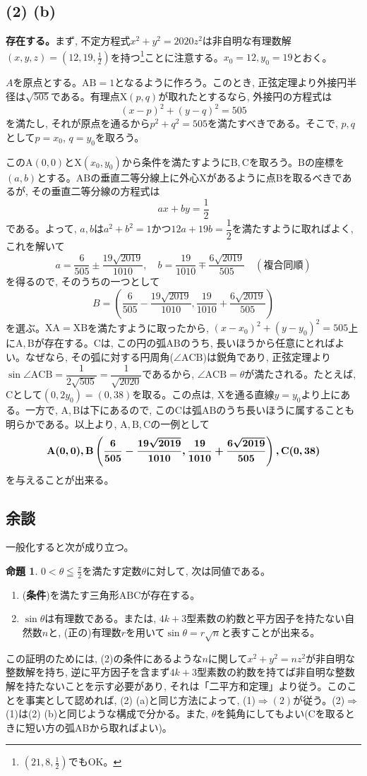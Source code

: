 \documentclass[twocolumn]{jbook}
\theoremstyle{definition}
\newtheorem{prop}[theo]{命題}
\newcommand{\bolm}[1]{{\mbox{\boldmath $#1$}}}
\newcommand{\tf}[1]{\textbf{#1}}
\newcommand{\ben}{\begin{enumerate}}
\newcommand{\een}{\end{enumerate}}
\newcommand{\nara}{\Rightarrow}
\newcommand{\mr}{\mathrm}
\renewcommand{\leq}{\leqq}
\newcommand{\parena}[1]{\left( #1\right)}
\begin{document}
\subsection*{(2) (b)} \tf{存在する。}まず, 不定方程式$x^2 + y^2 = 2020z^2$は非自明な有理数解$(x,y,z) = (12,19,\frac{1}{2})$を持つ\footnote{$(21,8,\frac{1}{2})$でもOK。}ことに注意する。$x_0=12, y_0=19$とおく。\par
$A$を原点とする。$\mr{AB} = 1$となるように作ろう。このとき, 正弦定理より外接円半径は$\sqrt{505}$である。有理点$\mr{X}(p,q)$が取れたとするなら, 外接円の方程式は
\[(x-p)^2 + (y-q)^2 = 505\]
を満たし, それが原点を通るから$p^2 + q^2 = 505$を満たすべきである。そこで, $p,q$として$p=x_0$, $q=y_0$を取ろう。\par
この$\mr{A}(0,0)$と$\mr{X}(x_0,y_0)$から条件を満たすように$\mr{B},\mr{C}$を取ろう。$\mr{B}$の座標を$(a,b)$とする。$\mr{AB}$の垂直二等分線上に外心$\mr{X}$があるように点$\mr{B}$を取るべきであるが, その垂直二等分線の方程式は
\[ax+by = \dfrac{1}{2}\]
である。よって, $a,b$は$a^2 + b^2 = 1$かつ$12a + 19b=\dfrac{1}{2}$を満たすように取ればよく, これを解いて
\[a= \dfrac{6}{505} \pm \dfrac{19\sqrt{2019}}{1010},\quad b=\dfrac{19}{1010}\mp \dfrac{6\sqrt{2019}}{505}\quad (複合同順)\]
を得るので, そのうちの一つとして
\[B = \parena{\dfrac{6}{505} - \dfrac{19\sqrt{2019}}{1010},\dfrac{19}{1010}+ \dfrac{6\sqrt{2019}}{505}}\]
を選ぶ。$\mr{XA} = \mr{XB}$を満たすように取ったから, $(x-x_0)^2 + (y-y_0)^2 = 505$上に$\mr{A},\mr{B}$が存在する。$\mr{C}$は, この円の弧$\mr{AB}$のうち, 長いほうから任意にとればよい。なぜなら, その弧に対する円周角($\angle{\mr{ACB}}$)は鋭角であり, 正弦定理より$\sin{\angle{\mr{ACB}}} = \dfrac{1}{2\sqrt{505}} =\dfrac{1}{\sqrt{2020}}$であるから, $\angle{\mr{ACB}} = \theta$が満たされる。たとえば, $\mr{C}$として$(0,2y_0) = (0,38)$を取る。この点は, $\mr{X}$を通る直線$y=y_0$より上にある。一方で, $\mr{A},\mr{B}$は下にあるので, この$\mr{C}$は弧$\mr{AB}$のうち長いほうに属することも明らかである。以上より, $\mr{A},\mr{B},\mr{C}$の一例として
\[\bolm{\mr{A}(0,0), \mr{B}\parena{\dfrac{6}{505} - \dfrac{19\sqrt{2019}}{1010},\dfrac{19}{1010}+ \dfrac{6\sqrt{2019}}{505}}, \mr{C}(0,38)}\]
を与えることが出来る。
\subsection{余談}
一般化すると次が成り立つ。
\begin{prop}
$0< \theta  \leq \frac{\pi}{2}$を満たす定数$\theta$に対して, 次は同値である。
\ben
\item (\tf{条件})を満たす三角形$\mr{ABC}$が存在する。
\item $\sin{\theta}$は有理数である。または, $4k+3$型素数の約数と平方因子を持たない自然数$n$と, (正の)有理数$r$を用いて$\sin{\theta} = r\sqrt{n}$と表すことが出来る。
\een
\end{prop}
この証明のためには, (2)の条件にあるような$n$に関して$x^2 + y^2 = nz^2$が非自明な整数解を持ち, 逆に平方因子を含まず$4k+3$型素数の約数を持てば非自明な整数解を持たないことを示す必要があり, それは「二平方和定理」より従う。このことを事実として認めれば, (2) (a)と同じ方法によって, (1)$\nara (2)$が従う。(2)$\nara$(1)は(2) (b)と同じような構成で分かる。また, $\theta$を鈍角にしてもよい($\mr{C}$を取るときに短い方の弧$\mr{AB}$から取ればよい)。
\end{document}
